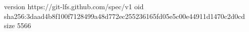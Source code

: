 version https://git-lfs.github.com/spec/v1
oid sha256:3daad4b8f100f7128499a48d772ec255236165fd05e5c00e44911d1470c2d0cd
size 5566
